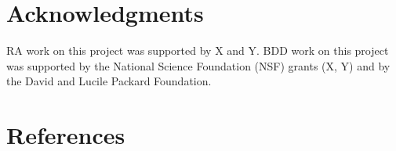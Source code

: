 \documentclass[11pt,letterpaper]{article}
\begin{document}




\section*{Acknowledgments}
RA work on this project was supported by X and Y. BDD work on this project was supported by the National Science Foundation (NSF) grants (X, Y) and by the David and Lucile Packard Foundation.

\section*{References}

\end{document}
